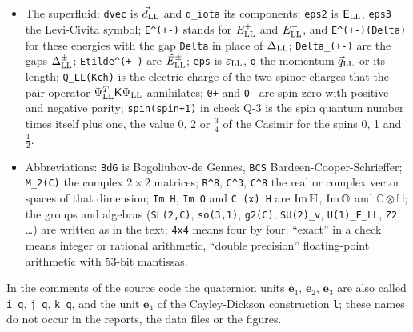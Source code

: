 \begin{itemize}
parts (and so for the others); \texttt{csP} and \texttt{cTT} are real. In checks M-3, M-4, M-7 and M-9
a failing triple or 4-tuple is given by the positions of its elements in the basis of the family:
positions 0, 1, 2 are $\mathbf e_1$, $\mathbf e_2$, $\mathbf e_3$ and 3, 4, 5 are $i\mathbf e_1$,
$i\mathbf e_2$, $i\mathbf e_3$ (the Lorentz part); in $\mathcal F^{\rm B}_{\rm LL}$ positions 6 to 9 are the
translations $\mathbf e_0$, $i\mathbf e_1$, $i\mathbf e_2$, $i\mathbf e_3$, and in $\mathcal F^{\rm C}_{\rm
LL}$ positions 6 to 8 are the isospin elements $\mathbf e_1$, $\mathbf e_2$, $\mathbf e_3$; the last eight
positions are the spinor charges $\mathbf e_4,\dots,\mathbf e_7$, $i\mathbf e_4,\dots,i\mathbf e_7$.
\item The superfluid: \texttt{dvec} is $\vec d_{\rm LL}$ and \texttt{d\_iota} its components;
\texttt{eps2} is $\mathsf E_{\rm LL}$, \texttt{eps3} the Levi-Civita symbol; \texttt{E\^{}(+-)} stands
for $E^+_{\rm LL}$ and $E^-_{\rm LL}$, and \texttt{E\^{}(+-)(Delta)} for these energies with the gap
\texttt{Delta} in place of $\Delta_{\rm LL}$; \texttt{Delta\_(+-)} are the gaps $\Delta^\pm_{\rm LL}$;
\texttt{Etilde\^{}(+-)} are $\tilde E^\pm_{\rm LL}$; \texttt{eps} is $\varepsilon_{\rm LL}$, \texttt{q} the
momentum $\vec q_{\rm LL}$ or its length; \texttt{Q\_LL(Kch)} is the electric charge of the two spinor
charges that the pair operator $\Psi^T_{\rm LL}\mathsf K\Psi_{\rm LL}$ annihilates; \texttt{0+} and
\texttt{0-} are spin zero with positive and negative parity; \texttt{spin(spin+1)} in check Q-3 is the
spin quantum number times itself plus one, the value 0, 2 or $\tfrac34$ of the Casimir for the spins 0,
1 and $\tfrac12$.
\item Abbreviations: \texttt{BdG} is Bogoliubov-de Gennes, \texttt{BCS} Bardeen-Cooper-Schrieffer;
\texttt{M\_2(C)} the complex $2\times2$ matrices; \texttt{R\^{}8}, \texttt{C\^{}3}, \texttt{C\^{}8} the
real or complex vector spaces of that dimension; \texttt{Im H}, \texttt{Im O} and \texttt{C (x) H} are
${\rm Im}\,\mathbb H$, ${\rm Im}\,\mathbb O$ and $\mathbb C\otimes\mathbb H$; the groups and algebras
(\texttt{SL(2,C)}, \texttt{so(3,1)}, \texttt{g2(C)}, \texttt{SU(2)\_v}, \texttt{U(1)\_F\_LL},
\texttt{Z2}, \dots) are written as in the text; \texttt{4x4} means four by four; ``exact'' in a check
means integer or rational arithmetic, ``double precision'' floating-point arithmetic with 53-bit
mantissas.
\end{itemize}
In the comments of the source code the quaternion units $\mathbf e_1$, $\mathbf e_2$, $\mathbf e_3$ are
also called \texttt{i\_q}, \texttt{j\_q}, \texttt{k\_q}, and the unit $\mathbf e_4$ of the Cayley-Dickson
construction \texttt{l}; these names do not occur in the reports, the data files or the figures.

